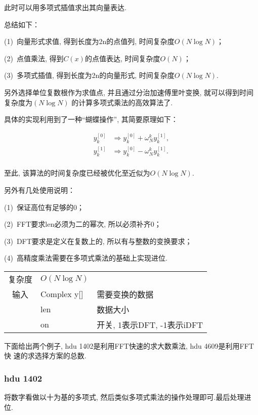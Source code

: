 此时可以用多项式插值求出其向量表达.

总结如下：

(1)\ 向量形式求值, 得到长度为2n的点值列, 时间复杂度$O(N \log N)$；

(2)\ 点值乘法, 得到$C(x)$的点值表达, 时间复杂度$O(N)$；

(3)\ 多项式插值, 得到长度为2n的向量形式, 时间复杂度$O(N \log N)$.

另外选择单位复数根作为求值点, 并且通过分治加速傅里叶变换, 就可以得到时间复杂度为$(N\log N)$
的计算多项式乘法的高效算法了.

具体的实现利用到了一种“蝴蝶操作”, 其简要原理如下：

\begin{equation}
\begin{aligned}
y_{k}^{[0]} &\Rightarrow y_{k}^{[0]} + \omega ^{k}_{N}y_{k}^{[1]},\\
y_{k}^{[1]} &\Rightarrow y_{k}^{[0]} - \omega ^{k}_{N}y_{k}^{[1]}.\\
\end{aligned}
\end{equation}

至此, 该算法的时间复杂度已经被优化至近似为$O(N \log N)$.

另外有几处使用说明：

(1)\ 保证高位有足够的0；

(2)\ FFT要求len必须为二的幂次, 所以必须补齐0；

(3)\ DFT要求是定义在复数上的, 所以有与整数的变换要求；

(4)\ 高精度乘法需要在多项式乘法的基础上实现进位.

\begin{longtable}{|c|l|l|}
复杂度 & $O(N\log N)$ &  \\
输入 & Complex y[] & 需要变换的数据 \\
 & len & 数据大小 \\
 & on & 开关, 1表示DFT, -1表示iDFT \\
\end{longtable}
下面给出两个例子, hdu 1402是利用FFT快速的求大数乘法, hdu 4609是利用FFT快
速的求选择方案的总数.


        \subsubsection{hdu 1402}\small
将数字看做以十为基的多项式, 然后类似多项式乘法的操作处理即可.最后处理进位.



